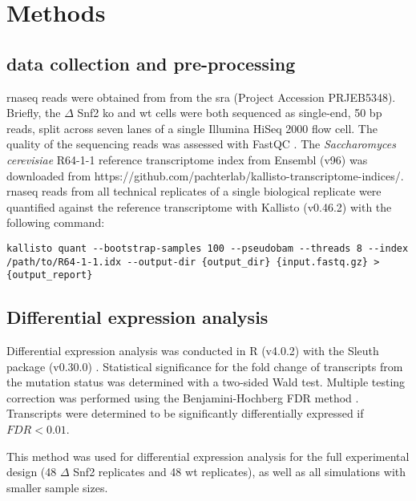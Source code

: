 \section{Methods}

\subsection{ data collection and pre-processing}

\Gls{rnaseq} reads were obtained from \cite[REF][]{gierlinskiStatisticalModelsRNAseq2015} from the \gls{sra} (Project Accession PRJEB5348).
Briefly, the $\Delta$ Snf2 \gls{ko} and \gls{wt} cells were both sequenced as single-end, 50 bp reads, split across seven lanes of a single Illumina HiSeq 2000 flow cell.
The quality of the sequencing reads was assessed with FastQC \cite{simonandrewsFastQCQualityControl2010}.
The \emph{Saccharomyces cerevisiae} R64-1-1 reference transcriptome index from Ensembl (v96) was downloaded from https://github.com/pachterlab/kallisto-transcriptome-indices/.
\Gls{rnaseq} reads from all technical replicates of a single biological replicate were quantified against the reference transcriptome with Kallisto (v0.46.2) \cite{brayNearoptimalProbabilisticRNAseq2016} with the following command:

\begin{lstlisting}[basicstyle=\ttfamily]
kallisto quant --bootstrap-samples 100 --pseudobam --threads 8 --index /path/to/R64-1-1.idx --output-dir {output_dir} {input.fastq.gz} > {output_report}
\end{lstlisting}

\subsection{Differential expression analysis}

Differential expression analysis was conducted in R (v4.0.2) \cite{rcoreteamLanguageEnvironmentStatistical2013} with the Sleuth package (v0.30.0) \cite{pimentelDifferentialAnalysisRNAseq2017,yiGenelevelDifferentialAnalysis2018}.
Statistical significance for the fold change of transcripts from the mutation status was determined with a two-sided Wald test.
Multiple testing correction was performed using the Benjamini-Hochberg FDR method \cite{benjaminiControllingFalseDiscovery1995}.
Transcripts were determined to be significantly differentially expressed if $FDR < 0.01$.

This method was used for differential expression analysis for the full experimental design (48 $\Delta$ Snf2 replicates and 48 \gls{wt} replicates), as well as all simulations with smaller sample sizes.

